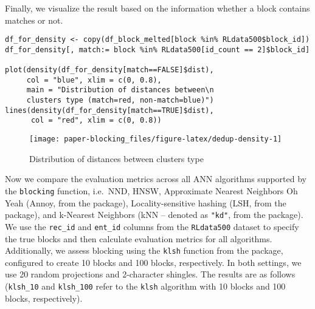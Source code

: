 Finally, we visualize the result based on the information whether a
block contains matches or not.

\begin{verbatim}
df_for_density <- copy(df_block_melted[block %in% RLdata500$block_id])
df_for_density[, match:= block %in% RLdata500[id_count == 2]$block_id]

plot(density(df_for_density[match==FALSE]$dist),
     col = "blue", xlim = c(0, 0.8), 
     main = "Distribution of distances between\n
     clusters type (match=red, non-match=blue)")
lines(density(df_for_density[match==TRUE]$dist),
      col = "red", xlim = c(0, 0.8))
\end{verbatim}

\begin{figure}[H]

{\centering \texttt{[image: paper-blocking\_files/figure-latex/dedup-density-1]} 

}

\caption{Distribution of distances between clusters type}\label{fig:dedup-density}
\end{figure}

Now we compare the evaluation metrics across all ANN algorithms
supported by the \texttt{blocking} function, i.e.~NND, HNSW, Approximate
Nearest Neighbors Oh Yeah (Annoy, from the  package),
Locality-sensitive hashing (LSH, from the  package), and
k-Nearest Neighbors (kNN -- denoted as \texttt{"kd"}, from the 
package). We use the \texttt{rec\_id} and \texttt{ent\_id} columns from the \texttt{RLdata500}
dataset to specify the true blocks and then calculate evaluation metrics
for all algorithms. Additionally, we assess blocking using the \texttt{klsh}
function from the  package, configured to create 10 blocks
and 100 blocks, respectively. In both settings, we use 20 random
projections and 2-character shingles. The results are as follows
(\texttt{klsh\_10} and \texttt{klsh\_100} refer to the \texttt{klsh} algorithm with 10 blocks
and 100 blocks, respectively).

